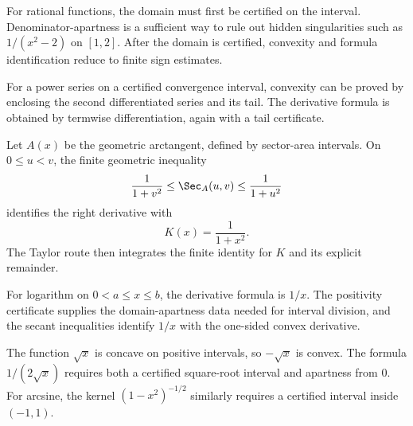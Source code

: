 \begin{example}\label{ex:rational-function-ftc}
For rational functions, the domain must first be certified on the interval.
Denominator-apartness is a sufficient way to rule out hidden singularities
such as \(1/(x^2-2)\) on \([1,2]\).  After the domain is certified,
convexity and formula identification reduce to finite sign estimates.
\end{example}

\begin{example}\label{ex:power-series-convex-ftc}
For a power series on a certified convergence interval, convexity can be
proved by enclosing the second differentiated series and its tail.  The
derivative formula is obtained by termwise differentiation, again with a tail
certificate.
\end{example}

\begin{example}\label{ex:arctan-ftc}
Let \(A(x)\) be the geometric arctangent, defined by sector-area intervals.
On \(0\le u<v\), the finite geometric inequality
\[
  \frac{1}{1+v^2}
  \le
  \Sec_A(u,v)
  \le
  \frac{1}{1+u^2}
\]
identifies the right derivative with
\[
  K(x)=\frac{1}{1+x^2}.
\]
The Taylor route then integrates the finite identity for \(K\) and its
explicit remainder.
\end{example}

\begin{example}[Logarithm]\label{ex:log-ftc}
For logarithm on \(0<a\le x\le b\), the derivative formula is \(1/x\).
The positivity certificate supplies the domain-apartness data needed for
interval division, and the secant inequalities identify \(1/x\) with the
one-sided convex derivative.
\end{example}

\begin{example}\label{ex:sqrt-arcsine-ftc}
The function \(\sqrt{x}\) is concave on positive intervals, so
\(-\sqrt{x}\) is convex.  The formula \(1/(2\sqrt{x})\) requires both a
certified square-root interval and apartness from \(0\).  For arcsine, the
kernel \((1-x^2)^{-1/2}\) similarly requires a certified interval inside
\((-1,1)\).
\end{example}

